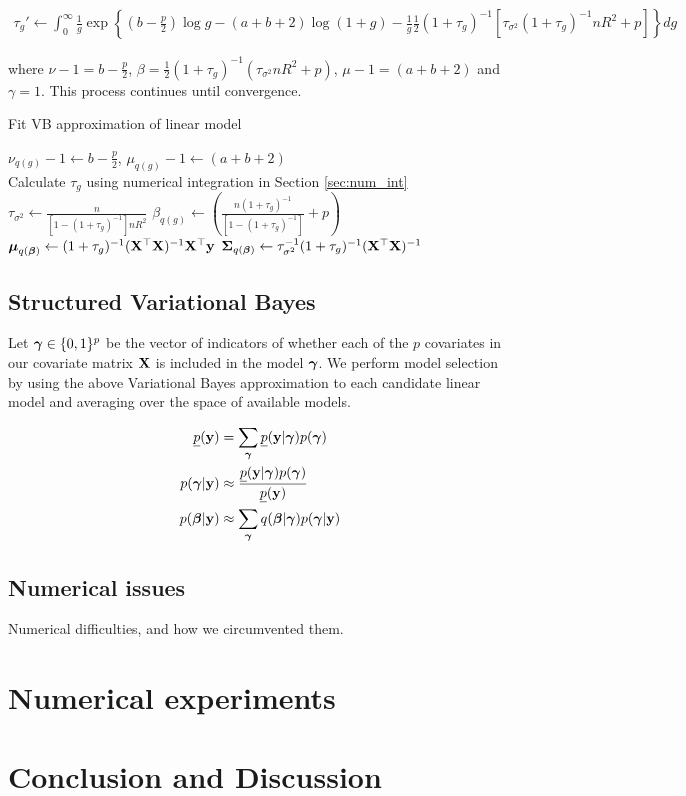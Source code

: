 \documentclass{amsart}[12pt]
\begin{document}
\begin{align*}
\tau_g' \leftarrow \int_0^\infty \frac{1}{g} \exp \left \{ \left(b - \frac{p}{2}\right) \log g
- (a + b + 2) \log(1 + g)
- \frac{1}{g} \frac{1}{2} (1 + \tau_g)^{-1} [\tau_{\sigma^2} (1 + \tau_g)^{-1} n R^2 + p]
	  \right \} dg
\end{align*}

where $\nu - 1 = b - \frac{p}{2}$, 
$\beta = \frac{1}{2} (1 + \tau_g)^{-1} (\tau_{\sigma^2} n R^2 + p)$, 
$\mu - 1 = (a + b + 2)$ and $\gamma = 1$. This process continues until convergence.

\begin{algorithm}
\label{alg:algorithm_one}
\caption{Fit VB approximation of linear model}
\begin{algorithmic}
\REQUIRE $\nu_{q(g)} - 1 \leftarrow b - \frac{p}{2}$, $\mu_{q(g)} - 1 \leftarrow (a + b + 2)$ \\
\STATE Calculate $\tau_{g}$ using numerical integration in Section \ref{sec:num_int}
\ENDWHILE
\STATE $\tau_{\sigma^2} \leftarrow \frac{n}{[1 - (1 + \tau_g)^{-1}] n R^2}$
\STATE $\beta_{q(g)} \leftarrow \left(\frac{n (1 + \tau_g)^{-1}}{[1 - (1 + \tau_g)^{-1}]} + p \right)$
\STATE ${\boldsymbol \mu}_{q({\boldsymbol \beta})} \leftarrow (1 + \tau_g)^{-1} ({\bf X}^\top {\bf X})^{-1} {\bf X}^\top {\bf y}$
\STATE ${\boldsymbol \Sigma}_{q({\boldsymbol \beta})} \leftarrow \tau_{\sigma^2}^{-1} (1 + \tau_{g})^{-1}({\bf X}^\top {\bf X})^{-1}$
\end{algorithmic}
\end{algorithm}

\subsection{Structured Variational Bayes}

Let ${\boldsymbol \gamma} \in \{0, 1\}^p$ be the vector of indicators of whether each of the $p$ covariates in our
covariate matrix ${\bf X}$ is included in the model ${\boldsymbol \gamma}$. We perform model selection by using the above
Variational Bayes approximation to each  candidate linear model and averaging over the space of available
models.

\begin{align*}
\underline{p}({\bf y}) &= \sum_{\boldsymbol \gamma} \underline{p}({\bf y}|{\boldsymbol \gamma}) p({\boldsymbol \gamma}) \\
p({\boldsymbol \gamma}|{\bf y}) &\approx \frac{\underline{p}({\bf y}|{\boldsymbol \gamma}) p({\boldsymbol \gamma})}{\underline{p}({\bf y})} \\
p({\boldsymbol \beta}|{\bf y}) &\approx \sum_{\boldsymbol \gamma} q({\boldsymbol \beta}|{\boldsymbol \gamma}) p({\boldsymbol \gamma}|{\bf y}) \\
\end{align*}

\subsection{Numerical issues}
Numerical difficulties, and how we circumvented them.

\section{Numerical experiments}
\label{sec:num_exp}

\section{Conclusion and Discussion}
\label{sec:conclusion}



\end{document}
